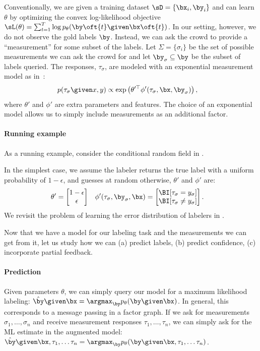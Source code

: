 Conventionally, we are given a training dataset $\sD = \{\bx_i, \by_i\}$ and can learn $\theta$ by optimizing the convex log-likelihood objective $\sL(\theta) = \sum_{t=1}^T \log \p(\by\oft{t} \given \bx\oft{t})$.
In our setting, however, we do not observe the gold labels $\by$. 
Instead, we can ask the crowd to provide a ``measurement'' for some subset of the labels.
Let $\Sigma = \{\sigma_i\}$ be the set of possible measurements we can ask the crowd for and 
let $\by_\sigma \subseteq \by$ be the subset of labels queried.
The responses, $\tau_\sigma$, are modeled with an exponential measurement model as in~\cite{liang09measurements}:
\begin{align*}
  p(\tau_\sigma \given x, y) 
  &\propto \exp \left( \theta'^\top\phi'(\tau_\sigma, \bx, \by_\sigma) \right),
\end{align*}
where $\theta'$ and $\phi'$ are extra parameters and features.
The choice of an exponential model allows us to simply include measurements as an additional factor.

\paragraph{Running example}
As a running example, consider the conditional random field in . 

In the simplest case, we assume the labeler returns the true label with a uniform probability of $1- \epsilon$, and guesses at random otherwise, $\theta'$ and $\phi'$ are:
\begin{align*}
  \theta' &= 
      \begin{bmatrix}
        1 - \e \\ \e
      \end{bmatrix} &
  \phi'(\tau_\sigma, \by_\sigma, \bx) &=
    \begin{bmatrix}
      \BI[\tau_\sigma = y_\sigma] \\
      \BI[\tau_\sigma \neq y_\sigma]
    \end{bmatrix}.
\end{align*}
We revisit the problem of learning the error distribution of labelers in .

Now that we have a model for our labeling task and the measurements we
can get from it, let us study how we can (a) predict labels, (b) predict
confidence, (c) incorporate partial feedback.

\paragraph{Prediction}
Given parameters $\theta$, we can simply query our model for a maximum likelihood labeling:
$\byt \given \bx = \argmax_{\by} \p(\by \given \bx)$.
In general, this corresponds to a message passing in a factor graph.
If we ask for measurements $\sigma_1, \ldots, \sigma_n$ and receive measurement responses $\tau_1, \ldots, \tau_n$, we can simply ask for the ML estimate in the augmented model:
$\byt \given \bx, \tau_1, \ldots \tau_n = \argmax_{\by} \p(\by \given \bx, \tau_1, \ldots \tau_n)$.

